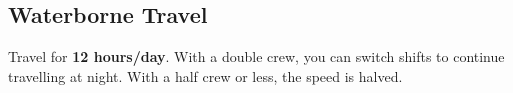 \documentclass[itdr/core]{subfiles}
\begin{document}

\vspace{-1ex}

\begin{comment}
\subparagraph{Horizon} is 3 miles away on a flat surface (for an Earth-sized planet), 12 miles at 100~ft height (ship's mast, tower), etc.: $dist.~(miles) \approx \sqrt{1.5 \times height~(ft)}$.

\vfill
\dimage{waterborne}{75pt}
\end{comment}

\begin{comment}
\subparagraph{Horizon} is 3 miles away for a 6~ft tall observer (on an Earth-sized planet), 12 miles at 100~ft height (ship's mast, tower), etc.:

\vspace{1ex}
\begin{vwcol}[widths={0.275, 0.725}, rule=0pt]

\vspace{-14pt}\noindent\hspace{0.25em}
$d \approx \sqrt{1.5 \times h}$

\vspace{6pt}\noindent
$$x \approx \frac{(d-o)^2}{1.5}$$

\columnbreak

$d$ --- horizon distance, miles

$h$ --- observer height, feet

$x$ --- object height obscured, feet

$o$ --- object distance, miles

\end{vwcol}

\vfill
\end{comment}


\subsection{Waterborne Travel}

Travel for \textbf{12 hours/day}. With a double crew, you can switch shifts to continue travelling at night. With a half crew or less, the speed is halved.
\end{document}
